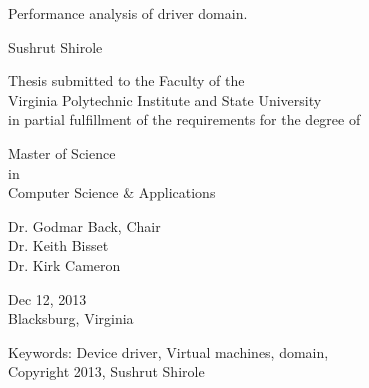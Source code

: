 \documentclass[12pt]{report}
\begin{document}
\thispagestyle{empty}
\begin{center}

{\Large 
Performance analysis of driver domain.
}

\vfill

Sushrut Shirole

\vfill

Thesis submitted to the Faculty of the \\
Virginia Polytechnic Institute and State University \\
in partial fulfillment of the requirements for the degree of

\vfill

Master of Science \\
in \\
Computer Science \& Applications

\vfill

Dr. Godmar Back, Chair \\
Dr. Keith Bisset \\
Dr. Kirk Cameron\\


\vfill

Dec 12, 2013 \\
Blacksburg, Virginia

\vfill

Keywords: Device driver, Virtual machines, domain,  
\\
Copyright 2013, Sushrut Shirole

\end{center}

\pagebreak
\end{document}
